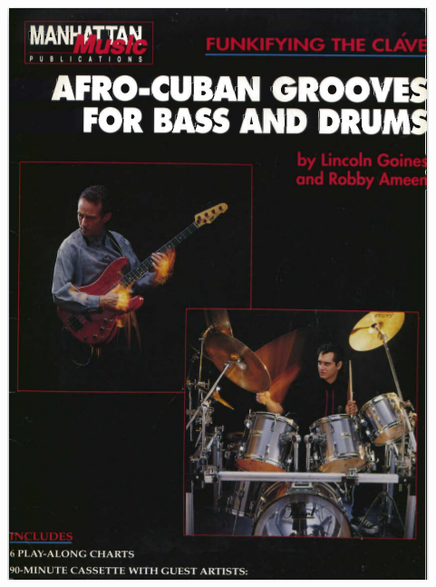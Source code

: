 \documentclass[a4paper]{book}
\begin{document}
\begin{center}
\includegraphics[width=12.301cm,height=16.693cm]{lebluessupportsmethodes-img167.png}
\end{center}
\end{document}
